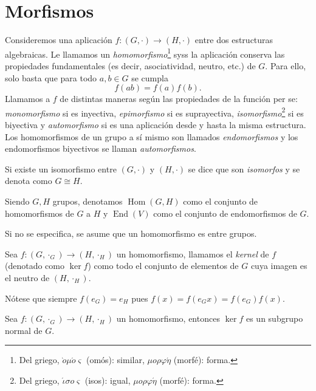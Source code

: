 \documentclass[11pt,oneside]{book}
\DeclareMathOperator{\Hom}{Hom}
\DeclareMathOperator{\End}{End}
\begin{document}
\section{Morfismos}
\begin{mydef}[Morfismos]
Consideremos una aplicación $f:(G,\cdot)\rightarrow(H,\cdot)$ entre dos estructuras algebraicas. Le llamamos un \textit{homomorfismo}\footnote{Del griego, $\grave{o}\mu\acute{o}\varsigma$ (omós): similar, $\mu o\rho\varphi\acute{\eta}$ (morfé): forma.} syss la aplicación conserva las propiedades fundamentales (es decir, asociatividad, neutro, etc.) de $G$. Para ello, solo basta que para todo $a,b\in G$ se cumpla
$$f(ab)=f(a)f(b).$$
Llamamos a $f$ de distintas maneras según las propiedades de la función per se: \textit{monomorfismo} si es inyectiva, \textit{epimorfismo} si es suprayectiva, \textit{isomorfismo}\footnote{Del griego, $\acute{\iota}\sigma o\varsigma$ (isos): igual, $\mu o\rho\varphi\acute{\eta}$ (morfé): forma.} si es biyectiva y \textit{automorfismo} si es una aplicación desde y hasta la misma estructura. Los homomorfismos de un grupo a sí mismo son llamados \textit{endomorfismos} y los endomorfismos biyectivos se llaman \textit{automorfismos}.

Si existe un isomorfismo entre $(G,\cdot)$ y $(H,\cdot)$ se dice que son \textit{isomorfos} y se denota como $G\cong H$.

Siendo $G,H$ grupos, denotamos $\Hom(G,H)$ %
como el conjunto de homomorfismos de $G$ a $H$ y $\End(V)$\nomenclature{$\End(A)$}{Conjunto de endomorfismos de $A$} como el conjunto de endomorfismos de $G$.
\end{mydef}
Si no se especifica, se asume que un homomorfismo es entre grupos.
\begin{mydef}[Kernel]
Sea $f:(G,\cdot_G)\rightarrow(H,\cdot_H)$ un homomorfismo, llamamos el \textit{kernel} de $f$ (denotado como $\ker f$)  como todo el conjunto de elementos de $G$ cuya imagen es el neutro de $(H,\cdot_H)$.
\end{mydef}
Nótese que siempre $f(e_G)=e_H$ pues $f(x)=f(e_G x)=f(e_G)f(x)$.
\begin{lem}
Sea $f:(G,\cdot_G)\rightarrow(H,\cdot_H)$ un homomorfismo, entonces $\ker f$ es un subgrupo normal de $G$.
\end{lem}
\end{document}
